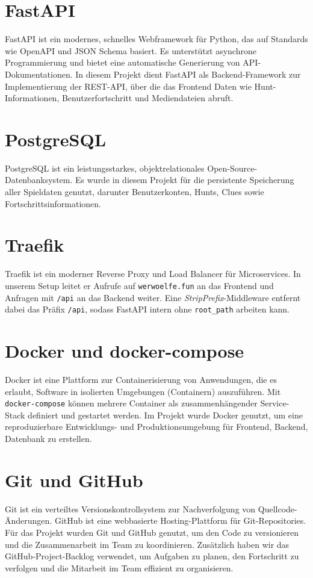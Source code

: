 \documentclass[oneside]{ausarbeitung}
\begin{document}
\section{FastAPI}
\label{sec:fastapi}
FastAPI ist ein modernes, schnelles Webframework für Python, das auf Standards wie OpenAPI und JSON Schema basiert\autocite{FastAPI:Official}. 
Es unterstützt asynchrone Programmierung und bietet eine automatische Generierung von API-Dokumentationen. 
In diesem Projekt dient FastAPI als Backend-Framework zur Implementierung der REST-API, über die das Frontend Daten wie Hunt-Informationen, Benutzerfortschritt und Mediendateien abruft.

\section{PostgreSQL}
\label{sec:postgresql}
PostgreSQL ist ein leistungsstarkes, objektrelationales Open-Source-Datenbanksystem\autocite{PostgreSQL:Official}. 
Es wurde in diesem Projekt für die persistente Speicherung aller Spieldaten genutzt, darunter Benutzerkonten, Hunts, Clues sowie Fortschrittsinformationen.

\section{Traefik}
\label{sec:traefik}
Traefik ist ein moderner Reverse Proxy und Load Balancer für Microservices\autocite{Traefik:Official}. 
In unserem Setup leitet er Aufrufe auf \texttt{werwoelfe.fun} an das Frontend und Anfragen mit \texttt{/api} an das Backend weiter. 
Eine \emph{StripPrefix}-Middleware entfernt dabei das Präfix \texttt{/api}, sodass FastAPI intern ohne \texttt{root\_path} arbeiten kann.



\section{Docker und docker-compose}
\label{sec:docker}
Docker ist eine Plattform zur Containerisierung von Anwendungen, die es erlaubt, Software in isolierten Umgebungen (Containern) auszuführen\autocite{Docker:Official}. 
Mit \texttt{docker-compose} können mehrere Container als zusammenhängender Service-Stack definiert und gestartet werden. 
Im Projekt wurde Docker genutzt, um eine reproduzierbare Entwicklungs- und Produktionsumgebung für Frontend, Backend, Datenbank zu erstellen.

\section{Git und GitHub}
\label{sec:git}
Git ist ein verteiltes Versionskontrollsystem zur Nachverfolgung von Quellcode-Änderungen\autocite{Git:Official}. 
GitHub ist eine webbasierte Hosting-Plattform für Git-Repositories.
Für das Projekt wurden Git und GitHub genutzt, um den Code zu versionieren und die Zusammenarbeit im Team zu koordinieren.
Zusätzlich haben wir das GitHub-Project-Backlog verwendet, um Aufgaben zu planen, den Fortschritt zu verfolgen und die Mitarbeit im Team effizient zu organisieren.
\end{document}
